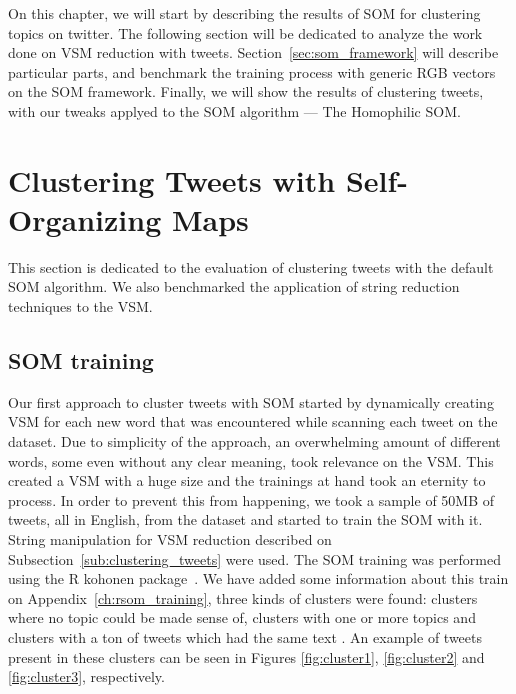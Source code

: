 \label{ch:eval_met}
On this chapter, we will start by describing the results of \ac{SOM} for clustering topics on twitter. The following section will be dedicated to analyze the work done on \ac{VSM} reduction with tweets.
Section~\ref{sec:som_framework} will describe particular parts, and benchmark the training process with generic RGB vectors on the \ac{SOM} framework. Finally, we will show the results of clustering tweets, with our tweaks applyed to the \ac{SOM} algorithm --- The Homophilic \ac{SOM}.

\section{Clustering Tweets with Self-Organizing Maps}
\label{sec:clustering_tbla}
This section is dedicated to the evaluation of clustering tweets with the default \ac{SOM} algorithm. We also benchmarked the application of string reduction techniques to the \ac{VSM}.  

\subsection{SOM training}
\label{sub:clustering_tweets_with_soms}
Our first approach to cluster tweets with \ac{SOM} started by dynamically creating \ac{VSM} for each new word that was encountered while scanning each tweet on the dataset. Due to simplicity of the approach, an overwhelming amount of different words, some even without any clear meaning, took relevance on the \ac{VSM}. 
This created a \ac{VSM} with a huge size and the trainings at hand took an eternity to process. In order to prevent this from happening, we took a sample of 50MB of tweets, all in English, from the dataset and started to train the \ac{SOM} with it. String manipulation for \ac{VSM} reduction described on Subsection~\ref{sub:clustering_tweets} were used.
The \ac{SOM} training was performed using the R kohonen package~\cite{rsom}. We have added some information about this train on Appendix~\ref{ch:rsom_training}, three kinds of clusters were found: clusters where no topic could be made sense of, clusters with one or more topics and clusters with a ton of tweets which had the same text . An example of tweets present in these clusters can be seen in Figures \ref{fig:cluster1}, \ref{fig:cluster2} and \ref{fig:cluster3}, respectively.  

